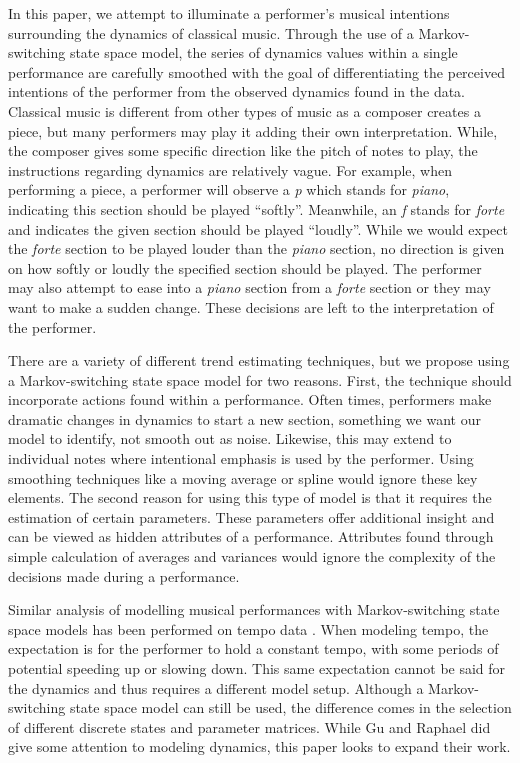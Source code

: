 \documentclass[12pt]{article}
\begin{document}
In this paper, we attempt to illuminate a performer's musical intentions
surrounding the dynamics of classical music. Through the use of a
Markov-switching state space model, the series of dynamics values within
a single performance are carefully smoothed with the goal of
differentiating the perceived intentions of the performer from the
observed dynamics found in the data. Classical music is different from
other types of music as a composer creates a piece, but many performers
may play it adding their own interpretation. While, the composer gives
some specific direction like the pitch of notes to play, the
instructions regarding dynamics are relatively vague. For example, when
performing a piece, a performer will observe a \emph{p} which stands for
\emph{piano}, indicating this section should be played ``softly''.
Meanwhile, an \emph{f} stands for \emph{forte} and indicates the given
section should be played ``loudly''. While we would expect the
\emph{forte} section to be played louder than the \emph{piano} section,
no direction is given on how softly or loudly the specified section
should be played. The performer may also attempt to ease into a
\emph{piano} section from a \emph{forte} section or they may want to
make a sudden change. These decisions are left to the interpretation of
the performer.

There are a variety of different trend estimating techniques, but we
propose using a Markov-switching state space model for two reasons.
First, the technique should incorporate actions found within a
performance. Often times, performers make dramatic changes in dynamics
to start a new section, something we want our model to identify, not
smooth out as noise. Likewise, this may extend to individual notes where
intentional emphasis is used by the performer. Using smoothing
techniques like a moving average or spline would ignore these key
elements. The second reason for using this type of model is that it
requires the estimation of certain parameters. These parameters offer
additional insight and can be viewed as hidden attributes of a
performance. Attributes found through simple calculation of averages and
variances would ignore the complexity of the decisions made during a
performance.

Similar analysis of modelling musical performances with Markov-switching
state space models has been performed on tempo data
\citep{mcdonald_markov-switching_2019,gu_modeling_2012}. When modeling
tempo, the expectation is for the performer to hold a constant tempo,
with some periods of potential speeding up or slowing down. This same
expectation cannot be said for the dynamics and thus requires a
different model setup. Although a Markov-switching state space model can
still be used, the difference comes in the selection of different
discrete states and parameter matrices. While Gu and Raphael did give
some attention to modeling dynamics, this paper looks to expand their
work.
\end{document}
